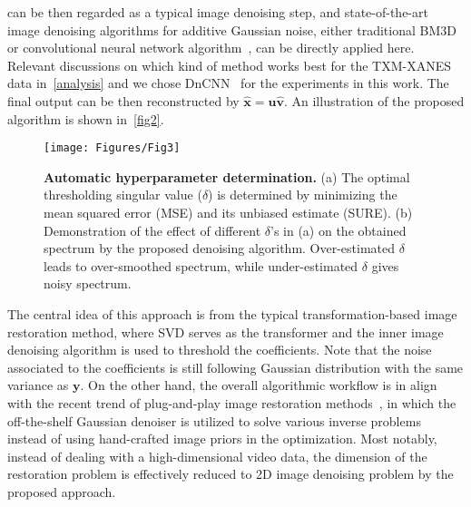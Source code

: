 \documentclass[10pt,twocolumn,letterpaper]{article}
\begin{document}
 can be then regarded as a typical image denoising step, and state-of-the-art image denoising algorithms for additive Gaussian noise, either traditional BM3D~\cite{dabov2007image} or convolutional neural network algorithm~\cite{zhang2017beyond}, can be directly applied here. Relevant discussions on which kind of method works best for the TXM-XANES data in~\cref{analysis} and we chose DnCNN~\cite{zhang2017beyond} for the experiments in this work. The final output can be then reconstructed by $\mathrm{\mathbf{\hat{x}}} = \mathrm{\mathbf{u}}\mathrm{\mathbf{\hat{v}}}$. An illustration of the proposed algorithm is shown in~\cref{fig2}. 
\begin{figure}
  \centering
    \texttt{[image: Figures/Fig3]}
    \vspace{-10pt}
    \caption{\textbf{Automatic hyperparameter determination.} (a) The optimal thresholding singular value ($\delta$) is determined by minimizing the mean squared error (MSE) and its unbiased estimate (SURE). (b) Demonstration of the effect of different $\delta$'s in (a) on the obtained spectrum by the proposed denoising algorithm. Over-estimated $\delta$ leads to over-smoothed spectrum, while under-estimated $\delta$ gives noisy spectrum.}
    \vspace{-12pt}
    \label{fig3}
\end{figure} 

The central idea of this approach is from the typical transformation-based image restoration method, where SVD serves as the transformer and the inner image denoising algorithm is used to threshold the coefficients. Note that the noise associated to the coefficients is still following Gaussian distribution with the same variance as $\mathrm{\mathbf{y}}$. On the other hand, the overall algorithmic workflow is in align with the recent trend of plug-and-play image restoration methods~\cite{venkatakrishnan2013plug,wu2020simba}, in which the off-the-shelf Gaussian denoiser is utilized to solve various inverse problems instead of using hand-crafted image priors in the optimization. Most notably, instead of dealing with a high-dimensional video data, the dimension of the restoration problem is effectively reduced to 2D image denoising problem by the proposed approach.
\end{document}
